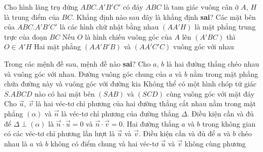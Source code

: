 \begin{ex}%
	Cho hình lăng trụ đứng $ABC.A'B'C'$ có đáy $ABC$ là tam giác vuông cân ở $A$, $H$ là trung điểm của $BC$. Khẳng định nào sau đây là khẳng định \textbf{sai}?
	\choice
	{\True Các mặt bên của $ABC.A'B'C'$ là các hình chữ nhật bằng nhau}
	{$(AA'H)$ là mặt phẳng trung trực của đoạn $BC$}
	{Nếu $O$ là hình chiếu vuông góc của $A$ lên $(A'BC)$ thì $O\in A'H$}
	{Hai mặt phẳng $(AA'B'B)$ và $(AA'C'C)$ vuông góc với nhau}
\end{ex}

\begin{ex}%
	Trong các mệnh đề sau, mệnh đề nào \textbf{sai}?
	\choice
	{\True Cho $a$, $b$ là hai đường thẳng chéo nhau và vuông góc với nhau. Đường vuông góc chung của $a$ và $b$ nằm trong mặt phẳng chứa đường này và vuông góc với đường kia}
	{Không thể có một hình chóp tứ giác $S.ABCD$ nào có hai mặt bên $(SAB)$ và $(SCD)$ cùng vuông góc với mặt đáy}
	{Cho $\vec{u}$, $\vec{v}$ là hai véc-tơ chỉ phương của hai đường thẳng cắt nhau nằm trong mặt phẳng $(\alpha)$ và $\vec{n}$ là véc-tơ chỉ phương của đường thẳng $\Delta$. Điều kiện cần và đủ để $\Delta\perp(\alpha)$ là $\vec{n}\cdot\vec{u}=0$ và $\vec{n}\cdot\vec{v}=0$.} 
	{Hai đường thẳng $a$ và $b$ trong không gian có các véc-tơ chỉ phương lần lượt là $\vec{u}$ và $\vec{v}$. Điều kiện cần và đủ để $a$ và $b$ chéo nhau là $a$ và $b$ không có điểm chung và hai véc-tơ $\vec{u}$ và $\vec{v}$ không cùng phương}
\end{ex}

